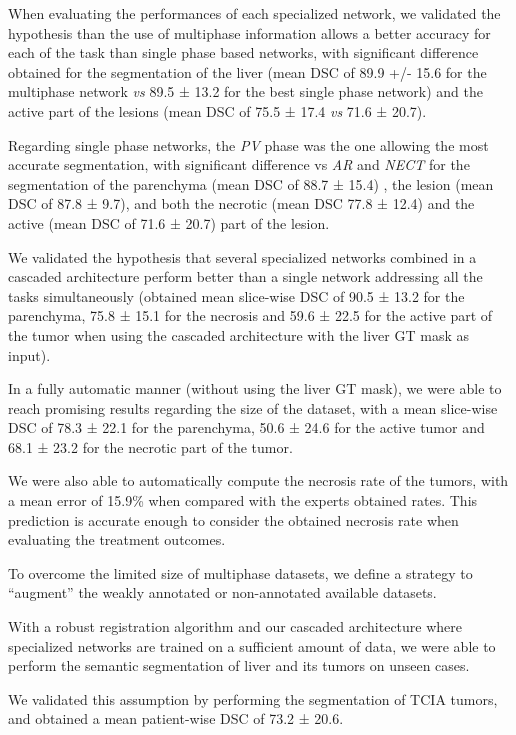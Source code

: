 When evaluating the performances of each specialized network, we
validated the hypothesis than the use of multiphase information allows a
better accuracy for each of the task than single phase based networks,
with significant difference obtained for the segmentation of the liver
(mean DSC of 89.9 +/- 15.6 for the multiphase network \emph{vs} 89.5 ±
13.2 for the best single phase network) and the active part of the
lesions (mean DSC of 75.5 ± 17.4 \emph{vs} 71.6 ± 20.7).

Regarding single phase networks, the \emph{PV} phase was the one
allowing the most accurate segmentation, with significant difference vs
\emph{AR} and \emph{NECT} for the segmentation of the parenchyma (mean
DSC of 88.7 ± 15.4) , the lesion (mean DSC of 87.8 ± 9.7), and both the
necrotic (mean DSC 77.8 ± 12.4) and the active (mean DSC of 71.6 ± 20.7)
part of the lesion.

We validated the hypothesis that several specialized networks combined
in a cascaded architecture perform better than a single network
addressing all the tasks simultaneously (obtained mean slice-wise DSC of
90.5 ± 13.2 for the parenchyma, 75.8 ± 15.1 for the necrosis and 59.6 ±
22.5 for the active part of the tumor when using the cascaded
architecture with the liver GT mask as input).

In a fully automatic manner (without using the liver GT mask), we were
able to reach promising results regarding the size of the dataset, with
a mean slice-wise DSC of 78.3 ± 22.1 for the parenchyma, 50.6 ± 24.6 for
the active tumor and 68.1 ± 23.2 for the necrotic part of the tumor.

We were also able to automatically compute the necrosis rate of the
tumors, with a mean error of 15.9\% when compared with the experts
obtained rates. This prediction is accurate enough to consider the
obtained necrosis rate when evaluating the treatment outcomes.

To overcome the limited size of multiphase datasets, we define a
strategy to ``augment'' the weakly annotated or non-annotated available
datasets.

With a robust registration algorithm and our cascaded architecture where
specialized networks are trained on a sufficient amount of data, we were
able to perform the semantic segmentation of liver and its tumors on
unseen cases.

We validated this assumption by performing the segmentation of TCIA
tumors, and obtained a mean patient-wise DSC of 73.2 ± 20.6.

